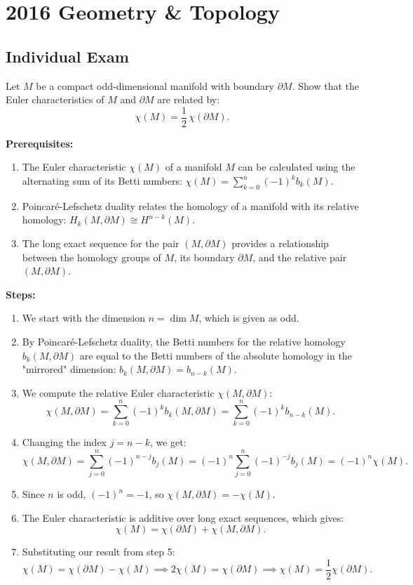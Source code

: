 \section{2016 Geometry \& Topology}

\subsection{Individual Exam}

\begin{exercise}
\label{geometry:2016:1}
Let $M$ be a compact odd-dimensional manifold with boundary $\partial M$. Show that the Euler characteristics of $M$ and $\partial M$ are related by:
\[ \chi(M) = \frac{1}{2}\,\chi(\partial M). \]
\end{exercise}

\begin{solution}
\textbf{Prerequisites:}
\begin{enumerate}
    \item The Euler characteristic $\chi(M)$ of a manifold $M$ can be calculated using the alternating sum of its Betti numbers: $\chi(M) = \sum_{k=0}^n (-1)^k b_k(M)$.
    \item Poincaré-Lefschetz duality relates the homology of a manifold with its relative homology: $H_k(M, \partial M) \cong H^{n-k}(M)$.
    \item The long exact sequence for the pair $(M, \partial M)$ provides a relationship between the homology groups of $M$, its boundary $\partial M$, and the relative pair $(M, \partial M)$.
\end{enumerate}

\textbf{Steps:}
\begin{enumerate}
    \item We start with the dimension $n = \dim M$, which is given as odd.
    \item By Poincaré-Lefschetz duality, the Betti numbers for the relative homology $b_k(M, \partial M)$ are equal to the Betti numbers of the absolute homology in the "mirrored" dimension: $b_k(M, \partial M) = b_{n-k}(M)$.
    \item We compute the relative Euler characteristic $\chi(M, \partial M)$:
    \[ \chi(M, \partial M) = \sum_{k=0}^n (-1)^k b_k(M, \partial M) = \sum_{k=0}^n (-1)^k b_{n-k}(M). \]
    \item Changing the index $j = n-k$, we get:
    \[ \chi(M, \partial M) = \sum_{j=0}^n (-1)^{n-j} b_j(M) = (-1)^n \sum_{j=0}^n (-1)^{-j} b_j(M) = (-1)^n \chi(M). \]
    \item Since $n$ is odd, $(-1)^n = -1$, so $\chi(M, \partial M) = -\chi(M)$.
    \item The Euler characteristic is additive over long exact sequences, which gives:
    \[ \chi(M) = \chi(\partial M) + \chi(M, \partial M). \]
    \item Substituting our result from step 5:
    \[ \chi(M) = \chi(\partial M) - \chi(M) \implies 2\chi(M) = \chi(\partial M) \implies \chi(M) = \frac{1}{2} \chi(\partial M). \]
\end{enumerate}



\end{solution}
